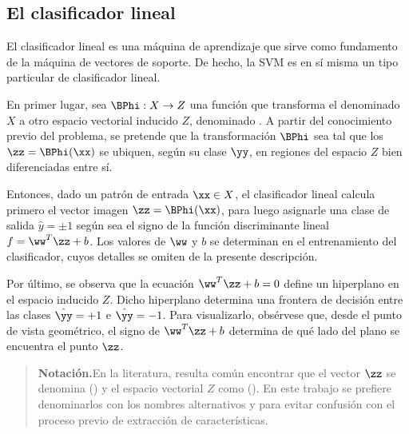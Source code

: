 %
%
\subsection{El clasificador lineal}
%
El clasificador lineal es una máquina de aprendizaje \cite{nilsson}
que sirve como fundamento de la máquina de vectores de soporte. De
hecho, la SVM es en sí misma un tipo particular de
clasificador lineal.

En primer lugar, sea $\BPhi:X\rightarrow{}Z$ una función que
transforma el denominado  $X$ a otro espacio
vectorial inducido $Z$, denominado .
A partir del
conocimiento previo del problema, se pretende que la transformación
$\BPhi$ sea tal que los  $\zz=\BPhi(\xx)$ se
ubiquen, según su clase $\yy$, en regiones del espacio $Z$ bien
diferenciadas entre sí.

Entonces, dado un patrón de entrada $\xx\in{}X$, el clasificador
lineal calcula primero el vector imagen $\zz=\BPhi(\xx)$, para luego
asignarle una clase de salida $\hat{y}=\pm{}1$ según sea el signo de
la función discriminante lineal $f=\ww^T\zz+b$. Los valores de $\ww$
y $b$ se determinan en el entrenamiento del clasificador, cuyos detalles
se omiten de la presente descripción.

Por último, se observa que la ecuación $\ww^T\zz+b=0$ define un
hiperplano en el espacio inducido $Z$. Dicho hiperplano determina una
frontera de decisión entre las clases $\hat{\yy}=+1$ e
$\hat{\yy}=-1$. Para visualizarlo, obsérvese que, desde el punto de
vista geométrico, el signo de $\ww^T\zz+b$ determina de qué lado del
plano se encuentra el punto $\zz$.
%
\begin{quote}
  {\bfseries Notación.}\quad{}En la literatura, resulta común
  encontrar que el vector $\zz$ se denomina  () y el espacio vectorial $Z$
  como  ().  En
  este trabajo se prefiere denominarlos con los nombres alternativos
   y  para evitar
  confusión con el proceso previo de extracción de características.
\end{quote}
%
